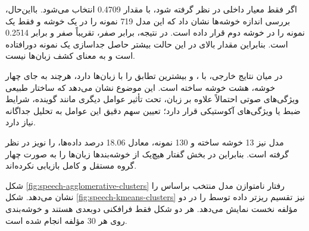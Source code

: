 \begin{table}[H]
\centering
\caption{مقایسه نتایج خوشه‌بندی گفتار}
\label{tab:speech-clustering-results}
\small
{}
\end{table}

اگر فقط معیار داخلی
در نظر گرفته شود،
با مقدار 0.4709 انتخاب می‌شود. بااین‌حال، بررسی اندازه خوشه‌ها نشان داد که این مدل 719 نمونه را در یک خوشه و فقط یک نمونه را در خوشه دوم قرار داده است. در نتیجه،
برابر صفر،
تقریباً صفر و
برابر 0.2514 است. بنابراین مقدار بالای
در این حالت بیشتر حاصل جداسازی یک نمونه دورافتاده است و به معنای کشف زبان‌ها نیست.

در میان نتایج خارجی،
با
،
و
بیشترین تطابق را با زبان‌ها دارد، هرچند به جای چهار خوشه، هشت خوشه ساخته است. این موضوع نشان می‌دهد که ساختار طبیعی ویژگی‌های صوتی احتمالاً علاوه بر زبان، تحت تأثیر عوامل دیگری مانند گوینده، شرایط ضبط یا ویژگی‌های آکوستیکی قرار دارد؛ تعیین سهم دقیق این عوامل به تحلیل جداگانه نیاز دارد.

مدل
نیز 13 خوشه ساخته و 130 نمونه، معادل 18.06 درصد داده‌ها، را نویز در نظر گرفته است. بنابراین در بخش گفتار هیچ‌یک از خوشه‌بندها زبان‌ها را به صورت چهار گروه مستقل و کامل بازیابی نکرده‌اند.

شکل
\ref{fig:speech-agglomerative-clusters}
رفتار نامتوازن مدل منتخب براساس
را نشان می‌دهد. شکل
\ref{fig:speech-kmeans-clusters}
نیز تقسیم ریزتر داده توسط
را در دو مؤلفه نخست
نمایش می‌دهد. هر دو شکل فقط فرافکنی دوبعدی هستند و خوشه‌بندی روی هر 30 مؤلفه انجام شده است.

